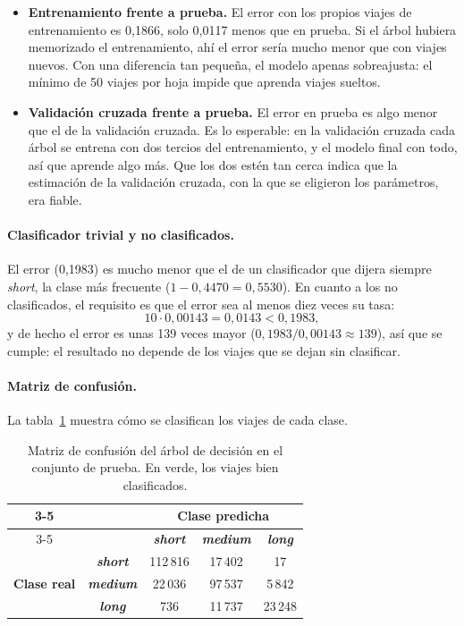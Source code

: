 \documentclass[12pt,a4paper]{article}
\begin{document}
\begin{itemize}
    \item \textbf{Entrenamiento frente a prueba.} El error con los propios
    viajes de entrenamiento es 0,1866, solo 0,0117 menos que en prueba. Si
    el árbol hubiera memorizado el entrenamiento, ahí el error sería mucho
    menor que con viajes nuevos. Con una diferencia tan pequeña, el modelo
    apenas sobreajusta: el mínimo de 50 viajes por hoja impide que aprenda
    viajes sueltos.
    \item \textbf{Validación cruzada frente a prueba.} El error en prueba es
    algo menor que el de la validación cruzada. Es lo esperable: en la
    validación cruzada cada árbol se entrena con dos tercios del
    entrenamiento, y el modelo final con todo, así que aprende algo más. Que
    los dos estén tan cerca indica que la estimación de la validación
    cruzada, con la que se eligieron los parámetros, era fiable.
\end{itemize}
 
\paragraph{Clasificador trivial y no clasificados.} El error (0,1983) es mucho menor que el de un
clasificador que dijera siempre \textit{short}, la clase más frecuente
($1 - 0{,}4470 = 0{,}5530$). En cuanto a los no clasificados, el requisito
es que el error sea al menos diez veces su tasa:
\[
10 \cdot 0{,}00143 = 0{,}0143 < 0{,}1983 ,
\]
y de hecho el error es unas 139 veces mayor ($0{,}1983 / 0{,}00143 \approx
139$), así que se cumple: el resultado no depende de los viajes que se
dejan sin clasificar.
 
\paragraph{Matriz de confusión.} La tabla~\ref{tab:cm-dt} muestra cómo se
clasifican los viajes de cada clase.
 
\begin{table}[H]
\centering
\renewcommand{\arraystretch}{1.2}
\begin{tabular}{cc|c|c|c|}
\cline{3-5}
& & \multicolumn{3}{c|}{\textbf{Clase predicha}} \\
\cline{3-5}
& & \textit{\textbf{short}} & \textit{\textbf{medium}} & \textit{\textbf{long}} \\
\hline
\multicolumn{1}{|c|}{\multirow{3}{*}{\textbf{Clase real}}} & \textit{\textbf{short}} & \cellcolor{green!25}112\,816 & 17\,402 & 17 \\
\cline{2-5}
\multicolumn{1}{|c|}{} & \textit{\textbf{medium}} & 22\,036 & \cellcolor{green!25}97\,537 & 5\,842 \\
\cline{2-5}
\multicolumn{1}{|c|}{} & \textit{\textbf{long}} & 736 & 11\,737 & \cellcolor{green!25}23\,248 \\
\hline
\end{tabular}
\caption{Matriz de confusión del árbol de decisión en el conjunto de
prueba. En verde, los viajes bien clasificados.}
\label{tab:cm-dt}
\end{table}
 
\end{document}
